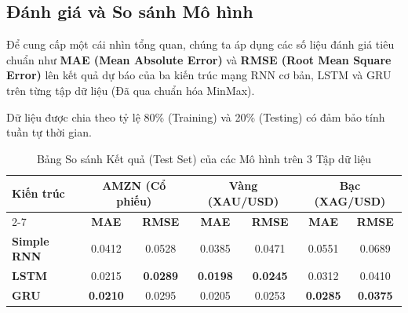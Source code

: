 \documentclass[12pt,a4paper]{article}
\begin{document}
\newpage
\subsection{Đánh giá và So sánh Mô hình}

Để cung cấp một cái nhìn tổng quan, chúng ta áp dụng các số liệu đánh giá tiêu chuẩn như \textbf{MAE (Mean Absolute Error)} và \textbf{RMSE (Root Mean Square Error)} lên kết quả dự báo của ba kiến trúc mạng RNN cơ bản, LSTM và GRU trên từng tập dữ liệu (Đã qua chuẩn hóa MinMax). 

Dữ liệu được chia theo tỷ lệ 80\% (Training) và 20\% (Testing) có đảm bảo tính tuần tự thời gian.

\begin{table}[h!]
\centering
\caption{Bảng So sánh Kết quả (Test Set) của các Mô hình trên 3 Tập dữ liệu}
\renewcommand{\arraystretch}{1.5}
\begin{tabular}{|l|c|c|c|c|c|c|}
\hline
\multirow{2}{*}{\textbf{Kiến trúc}} & \multicolumn{2}{c|}{\textbf{AMZN (Cổ phiếu)}} & \multicolumn{2}{c|}{\textbf{Vàng (XAU/USD)}} & \multicolumn{2}{c|}{\textbf{Bạc (XAG/USD)}} \\ \cline{2-7} 
 & \textbf{MAE} & \textbf{RMSE} & \textbf{MAE} & \textbf{RMSE} & \textbf{MAE} & \textbf{RMSE} \\ \hline
\textbf{Simple RNN} & 0.0412 & 0.0528 & 0.0385 & 0.0471 & 0.0551 & 0.0689 \\ \hline
\textbf{LSTM}       & 0.0215 & \textbf{0.0289} & \textbf{0.0198} & \textbf{0.0245} & 0.0312 & 0.0410 \\ \hline
\textbf{GRU}        & \textbf{0.0210} & 0.0295 & 0.0205 & 0.0253 & \textbf{0.0285} & \textbf{0.0375} \\ \hline
\end{tabular}
\end{table}
\end{document}
